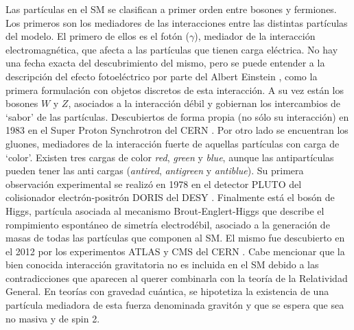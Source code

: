 Las partículas en el SM se clasifican a primer orden entre bosones y fermiones. Los primeros son los mediadores de las interacciones entre las distintas partículas del modelo. El primero de ellos es el fotón ($\gamma$), mediador de la interacción electromagnética, que afecta a las partículas que tienen carga eléctrica. No hay una fecha exacta del descubrimiento del mismo, pero se puede entender a la descripción del efecto fotoeléctrico por parte del Albert Einstein \cite{einstein}, como la primera formulación con objetos discretos de esta interacción. A su vez están los bosones $W$ y $Z$, asociados a la interacción débil y gobiernan los intercambios de `sabor' de las partículas. Descubiertos de forma propia (no sólo su interacción) en 1983 en el Super Proton Synchrotron del CERN . Por otro lado se encuentran los gluones, mediadores de la interacción fuerte de aquellas partículas con carga de `color'. Existen tres cargas de color \textit{red}, \textit{green} y \textit{blue}, aunque las antipartículas pueden tener las anti cargas (\textit{antired}, \textit{antigreen} y \textit{antiblue}). Su primera observación experimental se realizó en 1978 en el detector PLUTO del colisionador electrón-positrón DORIS del DESY \cite{gluon}. Finalmente está el bosón de Higgs, partícula asociada al mecanismo Brout-Englert-Higgs que describe el rompimiento espontáneo de simetría electrodébil, asociado a la generación de masas de todas las partículas que componen al SM. El mismo fue descubierto en el 2012 por los experimentos ATLAS y CMS del CERN \cite{higgs_atlas, higgs_cms}. Cabe mencionar que la bien conocida interacción gravitatoria no es incluida en el SM debido a las contradicciones que aparecen al querer combinarla con la teoría de la Relatividad General. En teorías con gravedad cuántica, se hipotetiza la existencia de una partícula mediadora de esta fuerza denominada gravitón y que se espera que sea no masiva y de spin 2.


